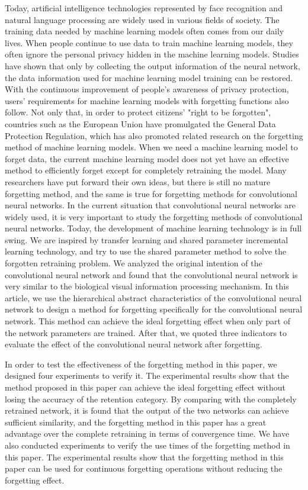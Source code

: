 \begin{abstract*}
  Today, artificial intelligence technologies represented by face recognition and natural language processing are widely used in various fields of society. 
  The training data needed by machine learning models often comes from our daily lives.
  When people continue to use data to train machine learning models, they often ignore the personal privacy hidden in the machine learning models.
  Studies have shown that only by collecting the output information of the neural network, the data information used for machine learning model training can be restored. 
  With the continuous improvement of people's awareness of privacy protection, users' requirements for machine learning models with forgetting functions also follow.
  Not only that, in order to protect citizens' "right to be forgotten", countries such as the European Union have promulgated the General Data Protection Regulation, 
  which has also promoted related research on the forgetting method of machine learning models.
  When we need a machine learning model to forget data, the current machine learning model does not yet have an effective method to efficiently forget except for completely retraining the model.
  Many researchers have put forward their own ideas, but there is still no mature forgetting method, and the same is true for forgetting methods for convolutional neural networks. 
  In the current situation that convolutional neural networks are widely used, it is very important to study the forgetting methods of convolutional neural networks.
  Today, the development of machine learning technology is in full swing. We are inspired by transfer learning and shared parameter incremental learning technology, and try to use the shared parameter method to solve the forgotten retraining problem.  
  We analyzed the original intention of the convolutional neural network and found that the convolutional neural network is very similar to the biological visual information processing mechanism.
  In this article, we use the hierarchical abstract characteristics of the convolutional neural network to design a method for forgetting specifically for the convolutional neural network. 
  This method can achieve the ideal forgetting effect when only part of the network parameters are trained.
  After that, we quoted three indicators to evaluate the effect of the convolutional neural network after forgetting.
  
  In order to test the effectiveness of the forgetting method in this paper, we designed four experiments to verify it. 
  The experimental results show that the method proposed in this paper can achieve the ideal forgetting effect without losing the accuracy of the retention category.
  By comparing with the completely retrained network, it is found that the output of the two networks can achieve sufficient similarity, 
  and the forgetting method in this paper has a great advantage over the complete retraining in terms of convergence time.
  We have also conducted experiments to verify the use times of the forgetting method in this paper. 
  The experimental results show that the forgetting method in this paper can be used for continuous forgetting operations without reducing the forgetting effect.

\end{abstract*}
